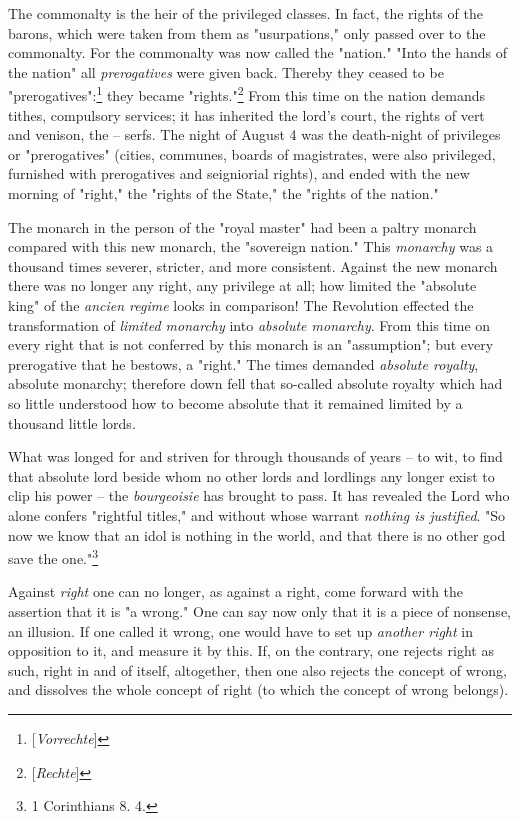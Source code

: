 \documentclass[a4paper]{book}
\begin{document}
The commonalty is the heir of the privileged classes. In fact, the rights of 
the barons, which were taken from them as "{}usurpations,"{} only passed over 
to the commonalty. For the commonalty was now called the "{}nation."{} "{}Into 
the hands of the nation"{} all \textit{prerogatives} were given back. Thereby 
they ceased to be "{}prerogatives"{}:\footnote{[\textit{Vorrechte}]} they 
became "{}rights."{}\footnote{[\textit{Rechte}]} From this time on the nation 
demands tithes, compulsory services; it has inherited the lord's court, the 
rights of vert and venison, the -- serfs. The night of August 4 was the 
death-night of privileges or "{}prerogatives"{} (cities, communes, boards of 
magistrates, were also privileged, furnished with prerogatives and seigniorial 
rights), and ended with the new morning of "{}right,"{} the "{}rights of the 
State,"{} the "{}rights of the nation."{}

The monarch in the person of the "{}royal master"{} had been a paltry monarch 
compared with this new monarch, the "{}sovereign nation."{} This 
\textit{monarchy} was a thousand times severer, stricter, and more consistent. 
Against the new monarch there was no longer any right, any privilege at all; 
how limited the "{}absolute king"{} of the \textit{ancien regime} looks in 
comparison! The Revolution effected the transformation of \textit{limited 
monarchy} into \textit{absolute monarchy}. From this time on every right that 
is not conferred by this monarch is an "{}assumption"{}; but every prerogative 
that he bestows, a "{}right."{} The times demanded \textit{absolute royalty}, 
absolute monarchy; therefore down fell that so-called absolute royalty which 
had so little understood how to become absolute that it remained limited by a 
thousand little lords.

What was longed for and striven for through thousands of years -- to wit, to 
find that absolute lord beside whom no other lords and lordlings any longer 
exist to clip his power -- the \textit{bourgeoisie} has brought to pass. It 
has revealed the Lord who alone confers "{}rightful titles,"{} and without 
whose warrant \textit{nothing is justified}. "{}So now we know that an idol is 
nothing in the world, and that there is no other god save the 
one."{}\footnote{1 Corinthians 8. 4.}

Against \textit{right} one can no longer, as against a right, come forward 
with the assertion that it is "{}a wrong."{} One can say now only that it is a 
piece of nonsense, an illusion. If one called it wrong, one would have to set 
up \textit{another right} in opposition to it, and measure it by this. If, on 
the contrary, one rejects right as such, right in and of itself, altogether, 
then one also rejects the concept of wrong, and dissolves the whole concept of 
right (to which the concept of wrong belongs).
\end{document}
